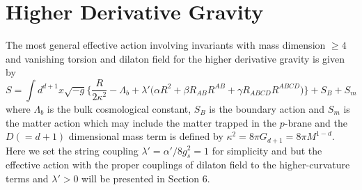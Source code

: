 \documentclass[a4paper,12pt]{article}
\begin{document}
\section{Higher Derivative Gravity}
The most general effective action involving invariants with mass dimension 
$\geq 4$ and vanishing torsion and dilaton field for the higher derivative 
gravity is given by
\begin{equation}
S=\int d^{d+1}x\sqrt{-g}\Big\{\frac{R}{2\kappa^2}-\Lambda_b
+\lambda'\big(\alpha R^2+\beta R_{AB}R^{AB}+\gamma R_{ABCD}R^{ABCD}\big)
\Big\}+S_B+S_m
\end{equation}
where $\Lambda_b$ is the bulk cosmological constant, $S_B$ is the boundary 
action and $S_m$ is the matter action which may include the matter trapped
 in the $p$-brane and the $D(=d+1)$ dimensional mass term is defined by 
$\kappa^2 = 8 \pi G_{d+1} = 8\pi M^{1-d}$. Here we set the string coupling 
$\lambda'=\alpha'/{8g_s^2}=1$ for simplicity and but the effective action 
with the proper couplings of dilaton field to the higher-curvature 
terms and $\lambda'>0$ will be presented in Section 6.
\end{document}
